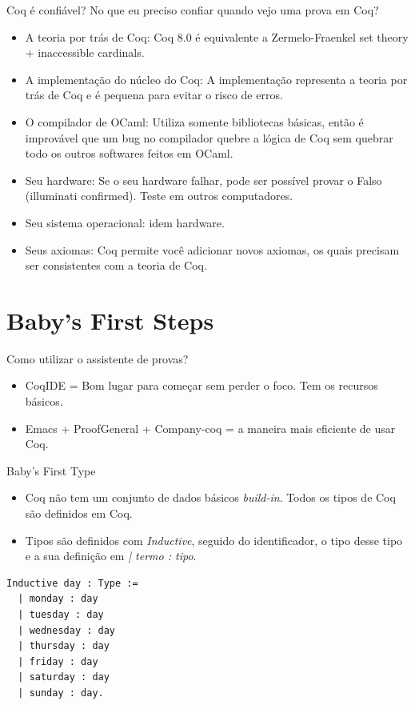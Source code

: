 \documentclass[presentation]{beamer}
\begin{document}
\begin{frame}[label={sec:orga1fe1ec}]{Coq é confiável?}
No que eu preciso confiar quando vejo uma prova em Coq? 
\begin{itemize}
\item \alert{A teoria por trás de Coq}: Coq 8.0 é equivalente a Zermelo-Fraenkel set theory + inaccessible cardinals.
\item \alert{A implementação do núcleo do Coq}: A implementação representa a teoria por trás de Coq e é pequena para evitar o risco de erros.
\item \alert{O compilador de OCaml}: Utiliza somente bibliotecas básicas, então é improvável que um bug no compilador quebre a lógica de Coq sem quebrar todo os outros softwares feitos em OCaml.
\item \alert{Seu hardware}: Se o seu hardware falhar, pode ser possível provar o Falso (illuminati confirmed). Teste em outros computadores.
\item \alert{Seu sistema operacional}: idem hardware.
\item \alert{Seus axiomas}: Coq permite você adicionar novos axiomas, os quais precisam ser consistentes com a teoria de Coq.
\end{itemize}
\end{frame}

\section{Baby's First Steps}
\label{sec:org47aab49}

\begin{frame}[label={sec:org2d55f23}]{Como utilizar o assistente de provas?}
\begin{itemize}
\item CoqIDE = Bom lugar para começar sem perder o foco. Tem os recursos básicos.
\item Emacs + ProofGeneral + Company-coq = a maneira mais eficiente de usar Coq.
\end{itemize}
\end{frame}

\begin{frame}[fragile,label={sec:org9c32e49}]{Baby's First Type}
 \begin{itemize}
\item Coq não tem um conjunto de dados básicos \emph{build-in}. Todos os tipos de Coq são definidos em Coq.
\item Tipos são definidos com \emph{Inductive}, seguido do identificador, o tipo desse tipo e a sua definição em \emph{| termo : tipo}.
\end{itemize}
\begin{verbatim}
Inductive day : Type :=
  | monday : day
  | tuesday : day
  | wednesday : day
  | thursday : day
  | friday : day
  | saturday : day
  | sunday : day.
\end{verbatim}
\end{frame}
\end{document}
